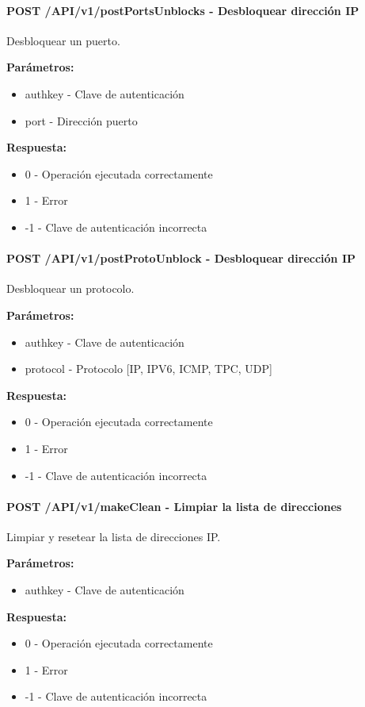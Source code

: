 \paragraph{\textbf{POST} /API/v1/postPortsUnblocks - Desbloquear dirección IP}
Desbloquear un puerto.

\textbf{Parámetros:}

\begin{itemize}
\item authkey - Clave de autenticación
\item port - Dirección puerto
\end{itemize}
\textbf{Respuesta:}
\begin{itemize}
\item 0 - Operación ejecutada correctamente
\item 1 - Error
\item -1 - Clave de autenticación incorrecta
\end{itemize}
\paragraph{\textbf{POST} /API/v1/postProtoUnblock - Desbloquear dirección IP}
Desbloquear un protocolo.

\textbf{Parámetros:}

\begin{itemize}
\item authkey - Clave de autenticación
\item protocol - Protocolo [IP, IPV6, ICMP, TPC, UDP]
\end{itemize}
\textbf{Respuesta:}
\begin{itemize}
\item 0 - Operación ejecutada correctamente
\item 1 - Error
\item -1 - Clave de autenticación incorrecta
\end{itemize}
\paragraph{\textbf{POST} /API/v1/makeClean - Limpiar la lista de direcciones}
Limpiar y resetear la lista de direcciones IP.

\textbf{Parámetros:}

\begin{itemize}
\item authkey - Clave de autenticación
\end{itemize}
\textbf{Respuesta:}
\begin{itemize}
\item 0 - Operación ejecutada correctamente
\item 1 - Error
\item -1 - Clave de autenticación incorrecta
\end{itemize}
